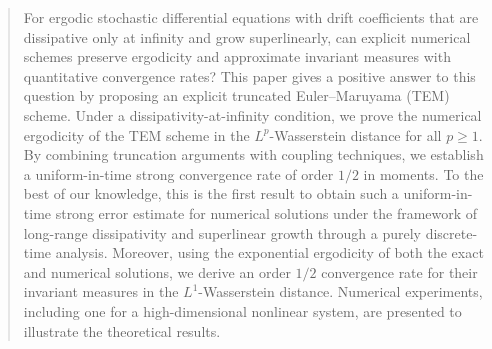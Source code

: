 \documentclass[aap]{imsart}
\theoremstyle{plain}
\theoremstyle{definition}
\begin{document}
\begin{frontmatter}
\begin{abstract}
For ergodic stochastic differential equations with drift coefficients that are dissipative only at infinity and grow superlinearly, can explicit numerical schemes preserve ergodicity and approximate invariant measures with quantitative convergence rates? This paper gives a positive answer to this question by proposing an explicit truncated Euler--Maruyama (TEM) scheme. Under a dissipativity-at-infinity condition, we prove the numerical ergodicity of the TEM scheme in the \(L^p\)-Wasserstein distance for all \(p\geqslant 1\). By combining truncation arguments with coupling techniques, we establish a uniform-in-time strong convergence rate of order \(1/2\) in moments. To the best of our knowledge, this is the first result to obtain such a uniform-in-time strong error estimate for numerical solutions under the framework of long-range dissipativity and superlinear growth through a purely discrete-time analysis. Moreover, using the exponential ergodicity of both the exact and numerical solutions, we derive an order \(1/2\) convergence rate for their invariant measures in the \(L^1\)-Wasserstein distance. Numerical experiments, including one for a high-dimensional nonlinear system, are presented to illustrate the theoretical results.
\end{abstract}

\begin{keyword}[class=MSC]
\end{keyword}

\begin{keyword}
\end{keyword}

\end{frontmatter}
\end{document}
